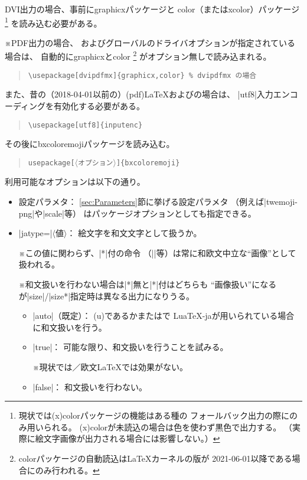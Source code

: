 \documentclass[a4paper]{ltjsarticle}
\renewcommand{\headfont}{\romanseries{sbc}\sffamily}
\newcommand{\Pkg}[1]{\textsf{#1}}
\newcommand{\Meta}[1]{$\langle$\mbox{}#1\mbox{}$\rangle$}
\newcommand{\RMeta}[1]{{\Meta{\rmfamily#1}}}
\newcommand{\Note}{\par\noindent ※}
\newcommand{\Means}{：\quad}
\newcommand{\／}{\mbox{}／\mbox{}}
\newcommand{\cs}[1]{\symbol{`\\}#1}
\providecommand{\Strong}[1]{{\headfont#1}}
\begin{document}
DVI出力の場合、事前に\Pkg{graphicx}パッケージと
\Pkg{color}（または\Pkg{xcolor}）パッケージ
\footnote{現状では\Pkg{(x)color}パッケージの機能はある種の
  フォールバック出力の際にのみ用いられる。
  \Pkg{(x)color}が未読込の場合は色を使わず黒色で出力する。
  （実際に絵文字画像が出力される場合には影響しない。）}%
を読み込む必要がある。

\Note PDF出力の場合、
およびグローバルのドライバオプションが指定されている場合は、
自動的に\Pkg{graphicx}と\Pkg{color}%
\footnote{\Pkg{color}パッケージの自動読込は{\LaTeX}カーネルの版が
  2021-06-01以降である場合にのみ行われる。}%
がオプション無しで読み込まれる。

\begin{quote}\small\begin{verbatim}
\usepackage[dvipdfmx]{graphicx,color} % dvipdfmx の場合
\end{verbatim}\end{quote}

また、昔の（2018-04-01以前の）(pdf){\LaTeX}および{\pLaTeX}の場合は、
|utf8|入力エンコーディングを有効化する必要がある。

\begin{quote}\small\begin{verbatim}
\usepackage[utf8]{inputenc}
\end{verbatim}\end{quote}

その後に\Pkg{bxcoloremoji}パッケージを読み込む。

\begin{quote}\small\begin{alltt}
\cs{usepackage}[\RMeta{オプション}]\{bxcoloremoji\}
\end{alltt}\end{quote}

利用可能なオプションは以下の通り。

\begin{itemize}
\item \Strong{設定パラメタ}\Means
  \ref{sec:Parameters}節に挙げる設定パラメタ
  （例えば|twemoji-png|や|scale|等）
  はパッケージオプションとしても指定できる。

\item |jatype=|\Meta{値}\Means
  絵文字を和文文字として扱うか。
  \Note この値に関わらず、|*|付の命令
  （||等）は常に和欧文中立な“画像”として扱われる。
  \Note 和文扱いを行わない場合は|*|無と|*|付はどちらも
  “画像扱い”になるが|size|/|size*|指定時は異なる出力になりうる。
  \begin{itemize}
  \item |auto|（既定）\Means
    (u){\pLaTeX}であるかまたは{\LuaLaTeX}で
    \Pkg{LuaTeX-ja}が用いられている場合に和文扱いを行う。
  \item |true|\Means
    可能な限り、和文扱いを行うことを試みる。
    \Note 現状では{\pdfLaTeX}\／{}欧文{\LaTeX}では効果がない。
  \item |false|\Means
    和文扱いを行わない。
  \end{itemize}
\end{itemize}
\end{document}
